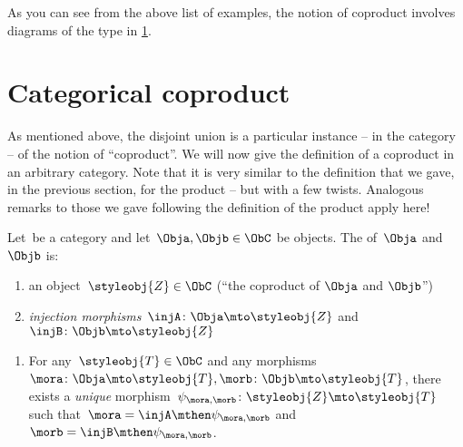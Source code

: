 
As you can see from the above list of examples, the notion of coproduct involves diagrams of the type in \cref{fig:coprod_generic}.

\begin{figure}[h!]
	\centering
	\caption{}
	\label{fig:coprod_generic}
\end{figure}

\section{Categorical coproduct}

As mentioned above, the disjoint union is a particular instance -- in the category \Set  -- of the notion of ``coproduct''.
We will now give the definition of a coproduct in an arbitrary category.
Note that it is very similar to the definition that we gave, in the previous section, for the product -- but with a few twists.
Analogous remarks to those we gave following the definition of the product apply here!

\begin{ctdefinition}
	\label{def:catcoproduct}
	Let~\CatC be a category and let~$\Obja, \Objb \in \ObC$ be objects.
	The \emph{} of~$\Obja$ and~$\Objb$ is: \\
	\constit
	\begin{enumerate}
		\item an object~$\styleobj{Z} \in \ObC$ (``the coproduct of $\Obja$ and $\Objb$'')
		\item \emph{injection morphisms}~$\injA \colon \Obja \mto \styleobj{Z} $ and~$\injB \colon \Objb \mto \styleobj{Z} $
	\end{enumerate}
	\condit
	\begin{enumerate}
		\item For any~$\styleobj{T} \in \ObC$ and any morphisms~$\mora \colon  \Obja \mto \styleobj{T}, \morb \colon \Objb \mto \styleobj{T}$, there exists a \emph{unique} morphism~$\psi_{\mora, \morb} \colon \styleobj{Z} \mto \styleobj{T}$ such that~$\mora = \injA\mthen \psi_{\mora, \morb}$ and~$\morb = \injB \mthen \psi_{\mora,\morb}$.
	\end{enumerate}
\end{ctdefinition}


